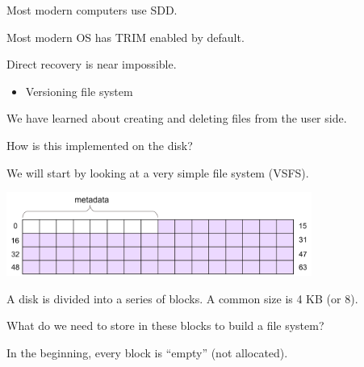 \begin{slide}


    Most modern computers use SDD.
    \bigskip

    Most modern OS has TRIM enabled by default.
    \bigskip

    Direct recovery is near impossible.
    \begin{itemize}
        \item Versioning file system
    \end{itemize}

\end{slide}

\begin{slide}


    We have learned about creating and deleting files from the user side.
    \bigskip

    How is this implemented on the disk?
    \bigskip

    We will start by looking at a very simple file system (VSFS).

\end{slide}

\begin{slide}


    \includegraphics[width=100mm]{VSFS-1.png}
    \bigskip

    A disk is divided into a series of blocks. A common size is 4 KB (or 8).
    \bigskip

    What do we need to store in these blocks to build a file system?
    \bigskip

    In the beginning, every block is “empty” (not allocated).

\end{slide}

